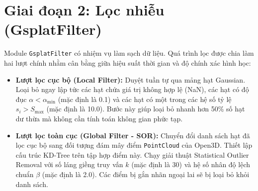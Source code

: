 \documentclass[a4paper,12pt]{report}
\begin{document}
\section{Giai đoạn 2: Lọc nhiễu (GsplatFilter)}
Module \texttt{GsplatFilter} có nhiệm vụ làm sạch dữ liệu. Quá trình lọc được chia làm hai lượt chính nhằm cân bằng giữa hiệu suất thời gian và độ chính xác hình học:
\begin{itemize}
    \item \textbf{Lượt lọc cục bộ (Local Filter):} Duyệt tuần tự qua mảng hạt Gaussian. Loại bỏ ngay lập tức các hạt chứa giá trị không hợp lệ (NaN), các hạt có độ đục $\alpha < \alpha_{\text{min}}$ (mặc định là 0.1) và các hạt có một trong các hệ số tỷ lệ $s_i > S_{\text{max}}$ (mặc định là 10.0). Bước này giúp loại bỏ nhanh hơn 50\% số hạt dư thừa mà không cần tính toán không gian phức tạp.
    \item \textbf{Lượt lọc toàn cục (Global Filter - SOR):} Chuyển đổi danh sách hạt đã lọc cục bộ sang đối tượng đám mây điểm \texttt{PointCloud} của Open3D. Thiết lập cấu trúc KD-Tree trên tập hợp điểm này. Chạy giải thuật Statistical Outlier Removal với số láng giềng truy vấn $k$ (mặc định là 30) và hệ số nhân độ lệch chuẩn $\beta$ (mặc định là 2.0). Các điểm bị gắn nhãn ngoại lai sẽ bị loại bỏ khỏi danh sách.
\end{itemize}

\clearpage
\end{document}
